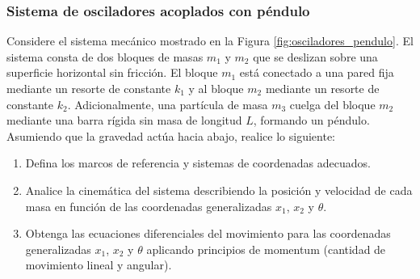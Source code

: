 \subsubsection{Sistema de osciladores acoplados con péndulo}

Considere el sistema mecánico mostrado en la Figura \ref{fig:osciladores_pendulo}. El sistema consta de dos bloques de masas $m_1$ y $m_2$ que se deslizan sobre una superficie horizontal sin fricción. El bloque $m_1$ está conectado a una pared fija mediante un resorte de constante $k_1$ y al bloque $m_2$ mediante un resorte de constante $k_2$. Adicionalmente, una partícula de masa $m_3$ cuelga del bloque $m_2$ mediante una barra rígida sin masa de longitud $L$, formando un péndulo. Asumiendo que la gravedad actúa hacia abajo, realice lo siguiente:

\begin{enumerate}
    \item Defina los marcos de referencia y sistemas de coordenadas adecuados.
    \item Analice la cinemática del sistema describiendo la posición y velocidad de cada masa en función de las coordenadas generalizadas $x_1$, $x_2$ y $\theta$.
    \item Obtenga las ecuaciones diferenciales del movimiento para las coordenadas generalizadas $x_1$, $x_2$ y $\theta$ aplicando principios de momentum (cantidad de movimiento lineal y angular).
\end{enumerate}

